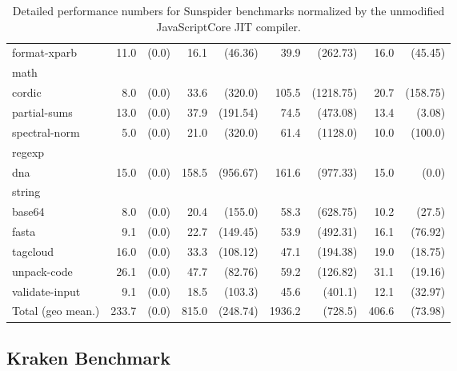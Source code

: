 \begin{table}[h!]
{\begin{tabular}{l|rr|rr|rr|rr}
\quad format-xparb & 11.0 & (0.0) & 16.1 & (46.36) & 39.9 & (262.73) & 16.0 & (45.45) \\
math&&&&&&&& \\
\quad cordic & 8.0 & (0.0) & 33.6 & (320.0) & 105.5 & (1218.75) & 20.7 & (158.75) \\
\quad partial-sums & 13.0 & (0.0) & 37.9 & (191.54) & 74.5 & (473.08) & 13.4 & (3.08) \\
\quad spectral-norm & 5.0 & (0.0) & 21.0 & (320.0) & 61.4 & (1128.0) & 10.0 & (100.0) \\
regexp&&&&&&&& \\
\quad dna & 15.0 & (0.0) & 158.5 & (956.67) & 161.6 & (977.33) & 15.0 & (0.0) \\
string&&&&&&&& \\
\quad base64 & 8.0 & (0.0) & 20.4 & (155.0) & 58.3 & (628.75) & 10.2 & (27.5) \\
\quad fasta & 9.1 & (0.0) & 22.7 & (149.45) & 53.9 & (492.31) & 16.1 & (76.92) \\
\quad tagcloud & 16.0 & (0.0) & 33.3 & (108.12) & 47.1 & (194.38) & 19.0 & (18.75) \\
\quad unpack-code & 26.1 & (0.0) & 47.7 & (82.76) & 59.2 & (126.82) & 31.1 & (19.16) \\
\quad validate-input & 9.1 & (0.0) & 18.5 & (103.3) & 45.6 & (401.1) & 12.1 & (32.97) \\
\hline
Total (geo mean.) & 233.7 & (0.0) & 815.0 & (248.74) & 1936.2 & (728.5) & 406.6 & (73.98) \\
\bottomrule
\end{tabular}
}
\caption{Detailed performance numbers for Sunspider benchmarks normalized by the unmodified JavaScriptCore JIT compiler.}
\label{tab:jitflow-performance-sunspider}
\end{table}

\newpage
\subsection{Kraken Benchmark}

